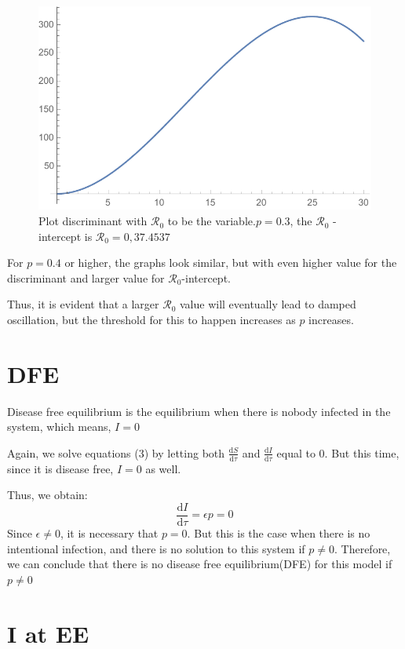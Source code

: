 \documentclass[12pt]{article}
\newcommand\dbyd[2]{\frac{\mathrm d{#1}}{\mathrm d{#2}}}
\newcommand{\R}{\mathcal{R}}
\begin{document}
\begin{figure}[H]
  \caption{Plot discriminant with $\mathcal{R}_0$ to be the variable.$p=0.3$, the $\mathcal{R}_0$ -intercept is $\mathcal{R}_0 = 0, 37.4537$}
  \centering
  \includegraphics[width=1.1\textwidth]{Figures/Plot_R_0_p_0_3.pdf}
\end{figure}

For $p=0.4$ or higher, the graphs look similar, but with even higher value for the discriminant and larger value for $\R_0$-intercept.

Thus, it is evident that a larger $\R_0$ value will eventually lead to damped oscillation, but the threshold for this to happen increases as $p$ increases.

\section{DFE}

Disease free equilibrium is the equilibrium when there is nobody infected in the system, which means, $I=0$

Again, we solve equations (3) by letting both $\dbyd{S}{\tau}$ and $\dbyd{I}{\tau}$ equal to 0. But this time, since it is disease free, $I=0$ as well.

Thus, we obtain:
\begin{equation}
\dbyd{I}{\tau}=\epsilon p=0
\end{equation}
Since $\epsilon\neq0$, it is necessary that $p=0$. But this is the case when there is no intentional infection, and there is no solution to this system if $p\neq0$. Therefore, we can conclude that there is no disease free equilibrium(DFE) for this model if $p\neq0$

\section{I at EE}
\end{document}
